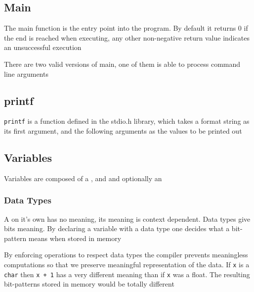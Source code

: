 \subsection{Main}


\par{The main function is the entry point into the program. By default it returns 0 if the end
is reached when executing, any other non-negative return value indicates an unsuccessful execution}
\par{There are two valid versions of main, one of them is able to process command line
arguments} 


\subsection{printf}
\par{\texttt{printf} is a function defined in the stdio.h library, which takes a format string as its first argument, and the following arguments as the values to be printed out}



\subsection{Variables}

\par{Variables are composed of a , and  and optionally an
}


\subsubsection{Data Types}

\par{A  on it's own has no meaning, its meaning is context dependent. Data
types give bits meaning. By declaring a variable with a data type one decides what a bit-pattern
means when stored in memory}
\par{By enforcing operations to respect data types the compiler prevents meaningless
computations so that we preserve meaningful representation of the data. If \texttt{x} is a
\texttt{char} then \texttt{x + 1} has a very different meaning than if \texttt{x} was a float. The
resulting bit-patterns stored in memory would be totally different}

